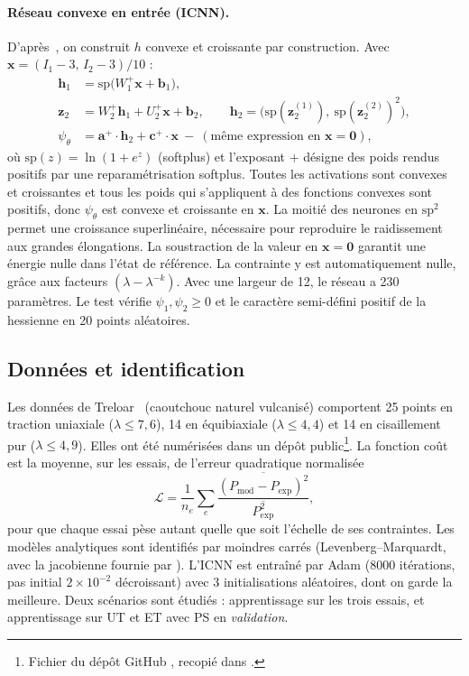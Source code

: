 \paragraph{Réseau convexe en entrée (ICNN).} D'après~\cite{amos2017}, on construit $h$ convexe et croissante par construction. Avec $\mathbf{x}=(I_1-3,\,I_2-3)/10$ :
\begin{align*}
\mathbf{h}_1 &= \mathrm{sp}\big(W_1^{+}\mathbf{x}+\mathbf{b}_1\big),\\
\mathbf{z}_2 &= W_2^{+}\mathbf{h}_1+U_2^{+}\mathbf{x}+\mathbf{b}_2,\qquad \mathbf{h}_2=\big(\mathrm{sp}(\mathbf{z}_2^{(1)}),\ \mathrm{sp}(\mathbf{z}_2^{(2)})^2\big),\\
\psi_\theta &= \mathbf{a}^{+}\cdot\mathbf{h}_2+\mathbf{c}^{+}\cdot\mathbf{x}\ -\ (\text{même expression en }\mathbf{x}=\mathbf{0}),
\end{align*}
où $\mathrm{sp}(z)=\ln(1+e^z)$ (softplus) et l'exposant $+$ désigne des poids rendus positifs par une reparamétrisation softplus. Toutes les activations sont convexes et croissantes et tous les poids qui s'appliquent à des fonctions convexes sont positifs, donc $\psi_\theta$ est convexe et croissante en $\mathbf{x}$. La moitié des neurones en $\mathrm{sp}^2$ permet une croissance superlinéaire, nécessaire pour reproduire le raidissement aux grandes élongations. La soustraction de la valeur en $\mathbf{x}=\mathbf{0}$ garantit une énergie nulle dans l'état de référence. La contrainte y est automatiquement nulle, grâce aux facteurs $(\lambda-\lambda^{-k})$. Avec une largeur de 12, le réseau a 230 paramètres. Le test  vérifie $\psi_1,\psi_2\ge0$ et le caractère semi-défini positif de la hessienne en 20 points aléatoires.

\subsection{Données et identification}

Les données de Treloar~\cite{treloar1944} (caoutchouc naturel vulcanisé) comportent 25 points en traction uniaxiale ($\lambda\le7{,}6$), 14 en équibiaxiale ($\lambda\le4{,}4$) et 14 en cisaillement pur ($\lambda\le4{,}9$). Elles ont été numérisées dans un dépôt public\footnote{Fichier  du dépôt GitHub , recopié dans .}. La fonction coût est la moyenne, sur les essais, de l'erreur quadratique normalisée
\begin{equation}
\mathcal{L}=\frac{1}{n_e}\sum_{e}\frac{\overline{(P_{\mathrm{mod}}-P_{\exp})^2}}{\overline{P_{\exp}^2}},
\end{equation}
pour que chaque essai pèse autant quelle que soit l'échelle de ses contraintes. Les modèles analytiques sont identifiés par moindres carrés (Levenberg--Marquardt, avec la jacobienne fournie par ). L'ICNN est entraîné par Adam (8000 itérations, pas initial $2\times10^{-2}$ décroissant) avec 3 initialisations aléatoires, dont on garde la meilleure. Deux scénarios sont étudiés : apprentissage sur les trois essais, et apprentissage sur UT et ET avec PS en \emph{validation}.

